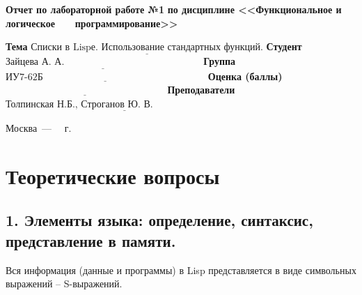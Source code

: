 \documentclass[12pt]{report}
\begin{document}
\begin{titlepage}
		\begin{center}
			\noindent\begin{minipage}{1.1\textwidth}\centering
				\Large\textbf{  Отчет по лабораторной работе №1}\newline
				\textbf{по дисциплине <<Функциональное и логическое}\newline
				\textbf{~~~программирование>>}\newline\newline
			\end{minipage}
		\end{center}
		
		\noindent\textbf{Тема} $\underline{\text{Списки в Lispе. Использование стандартных функций.}}$\newline\newline
		\noindent\textbf{Студент} $\underline{\text{Зайцева А. А.~~~~~~~~~~~~~~~~~~~~~~~~~~~~~~~~~~~~~~~~~~}}$\newline\newline
		\noindent\textbf{Группа} $\underline{\text{ИУ7-62Б~~~~~~~~~~~~~~~~~~~~~~~~~~~~~~~~~~~~~~~~~~~~~~~~~~}}$\newline\newline
		\noindent\textbf{Оценка (баллы)} $\underline{\text{~~~~~~~~~~~~~~~~~~~~~~~~~~~~~~~~~~~~~~~~~~~~~~~~~}}$\newline\newline
		\noindent\textbf{Преподаватели} $\underline{\text{Толпинская Н.Б., Строганов Ю. В.~~~~~~~~~~~~~~~~~~~~~~~~~~~~}}$\newline\newline\newline
		
		\begin{center}
			\vfill
			Москва~---~\the\year
			~г.
		\end{center}
	\end{titlepage}
	
\chapter*{Теоретические вопросы}
	
\section*{1.	Элементы языка: определение, синтаксис, представление в памяти.}
	
Вся информация (данные и программы) в Lisp представляется в виде символьных выражений – S-выражений. 
	
\end{document}
